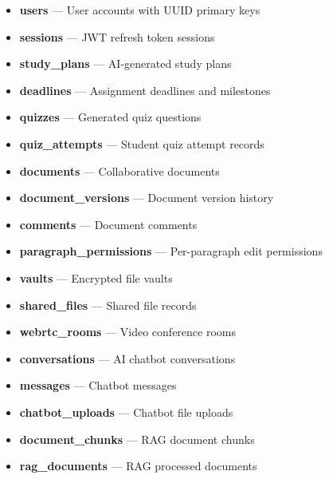 \documentclass[12pt,a4paper]{report}
\begin{document}
\begin{itemize}
    \item \textbf{users} --- User accounts with UUID primary keys
    \item \textbf{sessions} --- JWT refresh token sessions
    \item \textbf{study\_plans} --- AI-generated study plans
    \item \textbf{deadlines} --- Assignment deadlines and milestones
    \item \textbf{quizzes} --- Generated quiz questions
    \item \textbf{quiz\_attempts} --- Student quiz attempt records
    \item \textbf{documents} --- Collaborative documents
    \item \textbf{document\_versions} --- Document version history
    \item \textbf{comments} --- Document comments
    \item \textbf{paragraph\_permissions} --- Per-paragraph edit permissions
    \item \textbf{vaults} --- Encrypted file vaults
    \item \textbf{shared\_files} --- Shared file records
    \item \textbf{webrtc\_rooms} --- Video conference rooms
    \item \textbf{conversations} --- AI chatbot conversations
    \item \textbf{messages} --- Chatbot messages
    \item \textbf{chatbot\_uploads} --- Chatbot file uploads
    \item \textbf{document\_chunks} --- RAG document chunks
    \item \textbf{rag\_documents} --- RAG processed documents
\end{itemize}
\end{document}
